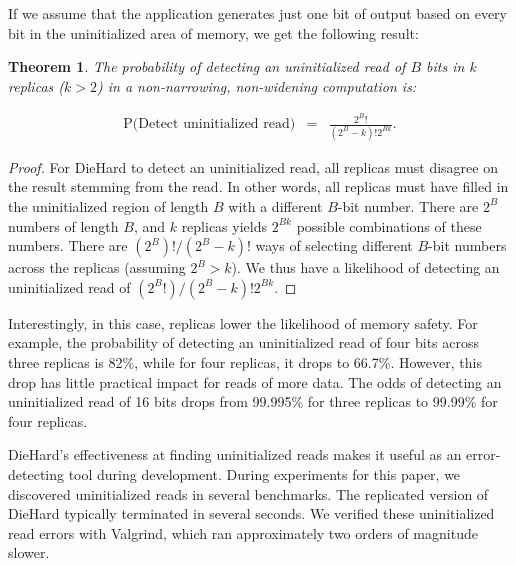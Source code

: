 \documentclass{sig-alternate}
\newtheorem{thm}{Theorem}
\begin{document}
If we assume that the application generates just one bit of output
based on every bit in the uninitialized area of memory, we get the
following result:


\begin{thm}
The probability of detecting an uninitialized read of $B$ bits in $k$
replicas ($k > 2$) in a \emph{non-narrowing}, \emph{non-widening}
computation is:

\begin{eqnarray*}
\mbox{P(Detect uninitialized read)} & = & \frac{2^B!}{(2^B-k)!2^{Bk}}.
\end{eqnarray*}
\label{thm:detect_uninit_read}
\end{thm}

\vskip -20pt

\begin{proof}
For DieHard to detect an uninitialized read, all replicas must
disagree on the result stemming from the read. In other words, all
replicas must have filled in the uninitialized region of length $B$
with a different $B$-bit number. There are $2^B$ numbers of length
$B$, and $k$ replicas yields $2^{Bk}$ possible combinations of these
numbers. There are $(2^B)!/(2^B-k)!$ ways of selecting different
$B$-bit numbers across the replicas (assuming $2^B > k$). We thus have
a likelihood of detecting an uninitialized read of
$(2^B!)/(2^B-k)!2^{Bk}$.
\end{proof}

Interestingly, in this case, replicas lower the likelihood of
memory safety. For example, the probability of detecting an
uninitialized read of four bits across three replicas is 82\%, while
for four replicas, it drops to 66.7\%. However, this drop has little
practical impact for reads of more data. The odds of detecting an
uninitialized read of 16 bits drops from 99.995\% for three
replicas to 99.99\% for four replicas.

DieHard's effectiveness at finding uninitialized reads makes it useful
as an error-detecting tool during development. During experiments for
this paper, we discovered uninitialized reads in several benchmarks.
The replicated version of DieHard typically terminated in several
seconds. We verified these uninitialized read errors with Valgrind,
which ran approximately two orders of magnitude slower.



\end{document}
